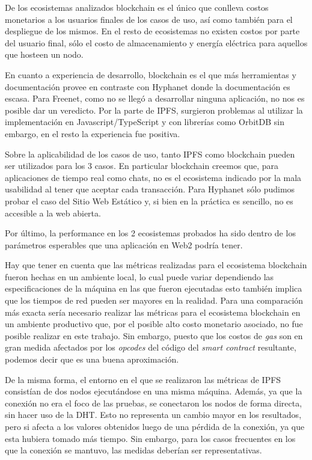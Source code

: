 De los ecosistemas analizados blockchain es el único que conlleva costos monetarios a los usuarios finales de los casos de uso, así como también para el despliegue de los mismos. En el resto de ecosistemas no existen costos por parte del usuario final, sólo el costo de almacenamiento y energía eléctrica para aquellos que hosteen un nodo.

En cuanto a experiencia de desarrollo, blockchain es el que más herramientas y documentación provee en contraste con Hyphanet donde la documentación es escasa. Para Freenet, como no se llegó a desarrollar ninguna aplicación, no nos es posible dar un veredicto. Por la parte de IPFS, surgieron problemas al utilizar la implementación en Javascript/TypeScript y con librerías como OrbitDB sin embargo, en el resto la experiencia fue positiva.

Sobre la aplicabilidad de los casos de uso, tanto IPFS como blockchain pueden ser utilizados para los 3 casos. En particular blockchain creemos que, para aplicaciones de tiempo real como chats, no es el ecosistema indicado por la mala usabilidad al tener que aceptar cada transacción. Para Hyphanet sólo pudimos probar el caso del Sitio Web Estático y, si bien en la práctica es sencillo, no es accesible a la web abierta.

Por último, la performance en los 2 ecosistemas probados ha sido dentro de los parámetros esperables que una aplicación en Web2 podría tener.

Hay que tener en cuenta que las métricas realizadas para el ecosistema blockchain fueron hechas en un ambiente local, lo cual puede variar dependiendo las especificaciones de la máquina en las que fueron ejecutadas esto también implica que los tiempos de red pueden ser mayores en la realidad. Para una comparación más exacta sería necesario realizar las métricas para el ecosistema blockchain en un ambiente productivo que, por el posible alto costo monetario asociado, no fue posible realizar en este trabajo. Sin embargo, puesto que los costos de \textit{gas} son en gran medida afectados por los \textit{opcodes} del código del \textit{smart contract} resultante, podemos decir que es una buena aproximación.

De la misma forma, el entorno en el que se realizaron las métricas de IPFS consistían de dos nodos ejecutándose en una misma máquina. Además, ya que la conexión no era el foco de las pruebas, se conectaron los nodos de forma directa, sin hacer uso de la DHT. Esto no representa un cambio mayor en los resultados, pero si afecta a los valores obtenidos luego de una pérdida de la conexión, ya que esta hubiera tomado más tiempo. Sin embargo, para los casos frecuentes en los que la conexión se mantuvo, las medidas deberían ser representativas.